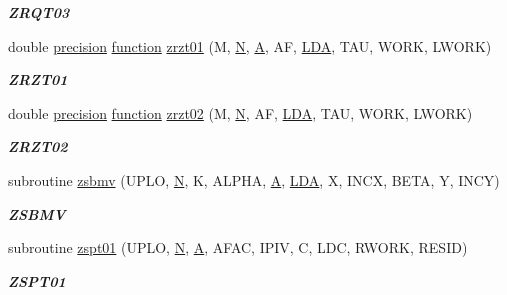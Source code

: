 \begin{DoxyCompactItemize}
\begin{DoxyCompactList}\small\item\em {\bfseries Z\+R\+Q\+T03} \end{DoxyCompactList}\item 
double \hyperlink{numinquire_8h_a2c8e616467665d0b2814d4c1589ba74e}{precision} \hyperlink{afunc_8m_a7b5e596df91eadea6c537c0825e894a7}{function} \hyperlink{group__complex16__lin_gaf1122e02331a632dfead5db00b321cc8}{zrzt01} (M, \hyperlink{polmisc_8c_a0240ac851181b84ac374872dc5434ee4}{N}, \hyperlink{classA}{A}, A\+F, \hyperlink{example__user_8c_ae946da542ce0db94dced19b2ecefd1aa}{L\+D\+A}, T\+A\+U, W\+O\+R\+K, L\+W\+O\+R\+K)
\begin{DoxyCompactList}\small\item\em {\bfseries Z\+R\+Z\+T01} \end{DoxyCompactList}\item 
double \hyperlink{numinquire_8h_a2c8e616467665d0b2814d4c1589ba74e}{precision} \hyperlink{afunc_8m_a7b5e596df91eadea6c537c0825e894a7}{function} \hyperlink{group__complex16__lin_gab41e74e93eb2076ef1f7da5aef0e398d}{zrzt02} (M, \hyperlink{polmisc_8c_a0240ac851181b84ac374872dc5434ee4}{N}, A\+F, \hyperlink{example__user_8c_ae946da542ce0db94dced19b2ecefd1aa}{L\+D\+A}, T\+A\+U, W\+O\+R\+K, L\+W\+O\+R\+K)
\begin{DoxyCompactList}\small\item\em {\bfseries Z\+R\+Z\+T02} \end{DoxyCompactList}\item 
subroutine \hyperlink{group__complex16__lin_ga63eabd833fa379aa63dafb0a57392fe4}{zsbmv} (U\+P\+L\+O, \hyperlink{polmisc_8c_a0240ac851181b84ac374872dc5434ee4}{N}, K, A\+L\+P\+H\+A, \hyperlink{classA}{A}, \hyperlink{example__user_8c_ae946da542ce0db94dced19b2ecefd1aa}{L\+D\+A}, X, I\+N\+C\+X, B\+E\+T\+A, Y, I\+N\+C\+Y)
\begin{DoxyCompactList}\small\item\em {\bfseries Z\+S\+B\+M\+V} \end{DoxyCompactList}\item 
subroutine \hyperlink{group__complex16__lin_ga1726c70221988e5ffd6cc9936d7987cd}{zspt01} (U\+P\+L\+O, \hyperlink{polmisc_8c_a0240ac851181b84ac374872dc5434ee4}{N}, \hyperlink{classA}{A}, A\+F\+A\+C, I\+P\+I\+V, C, L\+D\+C, R\+W\+O\+R\+K, R\+E\+S\+I\+D)
\begin{DoxyCompactList}\small\item\em {\bfseries Z\+S\+P\+T01} \end{DoxyCompactList}\item 

\end{DoxyCompactItemize}
